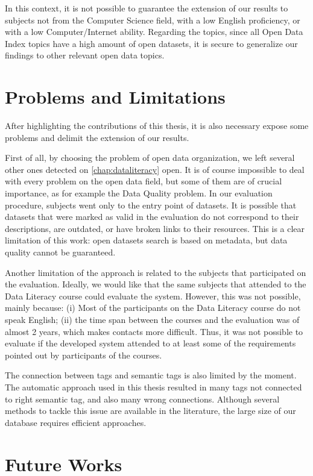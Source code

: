 In this context, it is not possible to guarantee the extension of our results to subjects not from the Computer Science field, with a low English proficiency, or with a low Computer/Internet ability.
Regarding the topics, since all Open Data Index topics have a high amount of open datasets, it is secure to generalize our findings to other relevant open data topics.

\section{Problems and Limitations}

After highlighting the contributions of this thesis, it is also necessary expose some problems and delimit the extension of our results.

First of all, by choosing the problem of open data organization, we left several other ones detected on \autoref{chap:dataliteracy} open.
It is of course impossible to deal with every problem on the open data field, but some of them are of crucial importance, as for example the Data Quality problem.
In our evaluation procedure, subjects went only to the entry point of datasets.
It is possible that datasets that were marked as valid in the evaluation do not correspond to their descriptions, are outdated, or have broken links to their resources.
This is a clear limitation of this work: open datasets search is based on metadata, but data quality cannot be guaranteed.

Another limitation of the approach is related to the subjects that participated on the evaluation.
Ideally, we would like that the same subjects that attended to the Data Literacy course could evaluate the system.
However, this was not possible, mainly because: (i) Most of the participants on the Data Literacy course do not speak English; (ii) the time span between the courses and the evaluation was of almost 2 years, which makes contacts more difficult.
Thus, it was not possible to evaluate if the developed system attended to at least some of the requirements pointed out by participants of the courses.

The connection between tags and semantic tags is also limited by the moment.
The automatic approach used in this thesis resulted in many tags not connected to right semantic tag, and also many wrong connections. 
Although several methods to tackle this issue are available in the literature, the large size of our database requires efficient approaches.


\section{Future Works}

